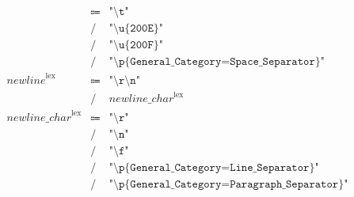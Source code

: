 \begin{align*}
\begin{array}{rcll}
        &\Coloneq &\texttt{"\textbackslash t"} \\
        &\mathrel{/} &\texttt{"\textbackslash u\{200E\}"} \\
        &\mathrel{/} &\texttt{"\textbackslash u\{200F\}"} \\
        &\mathrel{/} &\texttt{"\textbackslash p\{General\_Category=Space\_Separator\}"} \\
        \mathit{newline}^\mathrm{lex}
        &\Coloneq &\texttt{"\textbackslash r\textbackslash n"} \\
        &\mathrel{/} &\mathit{newline\_char}^\mathrm{lex} \\
        \mathit{newline\_char}^\mathrm{lex}
        &\Coloneq &\texttt{"\textbackslash r"} \\
        &\mathrel{/} &\texttt{"\textbackslash n"} \\
        &\mathrel{/} &\texttt{"\textbackslash f"} \\
        &\mathrel{/} &\texttt{"\textbackslash p\{General\_Category=Line\_Separator\}"} \\
        &\mathrel{/} &\texttt{"\textbackslash p\{General\_Category=Paragraph\_Separator\}"}
    \end{array}
\end{align*}

